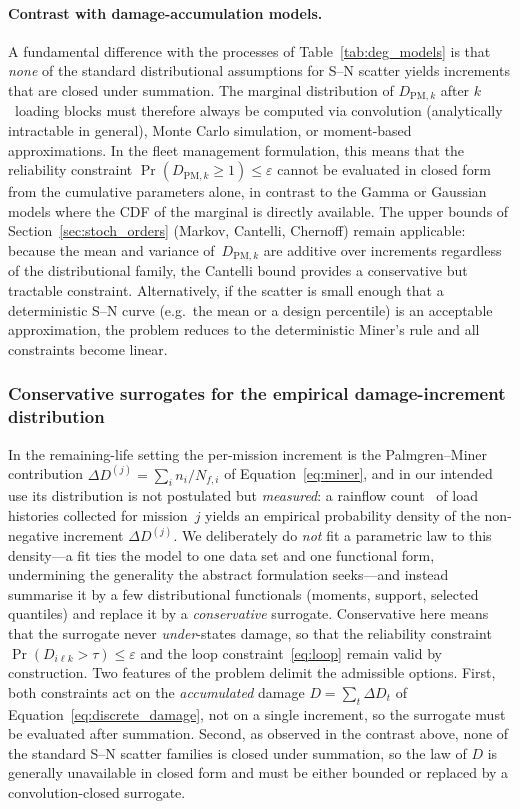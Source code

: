 \documentclass[11pt,a4paper]{article}
\theoremstyle{plain}
\theoremstyle{definition}
\theoremstyle{remark}
\begin{document}
\paragraph{Contrast with damage-accumulation models.}
A fundamental difference with the processes of Table~\ref{tab:deg_models} is that \emph{none} of the standard distributional assumptions for S--N scatter yields increments that are closed under summation.
The marginal distribution of $D_{\mathrm{PM},k}$ after $k$~loading blocks must therefore always be computed via convolution (analytically intractable in general), Monte Carlo simulation, or moment-based approximations.
In the fleet management formulation, this means that the reliability constraint $\Pr(D_{\mathrm{PM},k} \ge 1) \le \varepsilon$ cannot be evaluated in closed form from the cumulative parameters alone, in contrast to the Gamma or Gaussian models where the CDF of the marginal is directly available.
The upper bounds of Section~\ref{sec:stoch_orders} (Markov, Cantelli, Chernoff) remain applicable: because the mean and variance of~$D_{\mathrm{PM},k}$ are additive over increments regardless of the distributional family, the Cantelli bound provides a conservative but tractable constraint.
Alternatively, if the scatter is small enough that a deterministic S--N curve (e.g.\ the mean or a design percentile) is an acceptable approximation, the problem reduces to the deterministic Miner's rule and all constraints become linear.

\subsubsection{Conservative surrogates for the empirical damage-increment distribution}
\label{sec:cons_surrogates}

In the remaining-life setting the per-mission increment is the Palmgren--Miner contribution $\Delta D^{(j)} = \sum_i n_i/N_{f,i}$ of Equation~\eqref{eq:miner}, and in our intended use its distribution is not postulated but \emph{measured}: a rainflow count~\cite{MunizCalvente2022} of load histories collected for mission~$j$ yields an empirical probability density of the non-negative increment $\Delta D^{(j)}$.
We deliberately do \emph{not} fit a parametric law to this density---a fit ties the model to one data set and one functional form, undermining the generality the abstract formulation seeks---and instead summarise it by a few distributional functionals (moments, support, selected quantiles) and replace it by a \emph{conservative} surrogate.
Conservative here means that the surrogate never \emph{under}-states damage, so that the reliability constraint $\Pr(D_{i\ell k} > \tau) \le \varepsilon$ and the loop constraint~\eqref{eq:loop} remain valid by construction.
Two features of the problem delimit the admissible options.
First, both constraints act on the \emph{accumulated} damage $D = \sum_t \Delta D_t$ of Equation~\eqref{eq:discrete_damage}, not on a single increment, so the surrogate must be evaluated after summation.
Second, as observed in the contrast above, none of the standard S--N scatter families is closed under summation, so the law of $D$ is generally unavailable in closed form and must be either bounded or replaced by a convolution-closed surrogate.
\end{document}
